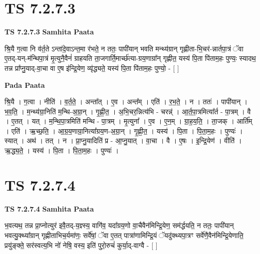 \documentclass[17pt]{extarticle}
\begin{document}
\section*{ TS 7.2.7.3 }

\textbf{TS 7.2.7.3 } \newline
\textbf{Samhita Paata} \newline

श्रि॒यै ग॒त्वा नि व॑र्त॒ते ऽन्ता॑दे॒वाऽन्त॒मा र॑भते॒ न ततः॒ पापी॑यान् भवति मन्थ्य॑ग्रान् गृह्णीता-भि॒चर॑-न्नार्तपा॒त्रं ॅवा ए॒तद्-यन्-म॑न्थिपा॒त्रं मृ॒त्युनै॒वैनं॑ ग्राहयति ता॒जगार्ति॒मार्च्छ॑त्या-ग्रय॒णाग्रा᳚न् गृह्णीत॒ यस्य॑ पि॒ता पि॑ताम॒हः पुण्यः॒ स्यादथ॒ तन्न प्रा᳚प्नु॒याद्-वा॒चा वा ए॒ष इ॑न्द्रि॒येण॒ व्यृ॑द्ध्यते॒ यस्य॑ पि॒ता पि॑ताम॒हः पुण्यो॒ - [  ] \newline

\textbf{Pada Paata} \newline

श्रि॒यै । ग॒त्वा । नीति॑ । व॒र्त॒ते॒ । अन्ता᳚त् । ए॒व । अन्त᳚म् । एति॑ । र॒भ॒ते॒ । न । ततः॑ । पापी॑यान् । भ॒व॒ति॒ । म॒न्थ्य॑ग्रा॒निति॑ म॒न्थि-अ॒ग्रा॒न् । गृ॒ह्णी॒त॒ । अ॒भि॒चर॒न्नित्य॑भि - चरन्न्॑ । आ॒र्त॒पा॒त्रमित्या᳚र्त - पा॒त्रम् । वै । ए॒तत् । यत् । म॒न्थि॒पा॒त्रमिति॑ मन्थि - पा॒त्रम् । मृ॒त्युना᳚ । ए॒व । ए॒न॒म् । ग्रा॒ह॒य॒ति॒ । ता॒जक् । आर्ति᳚म् । एति॑ । ऋ॒च्छ॒ति॒ । आ॒ग्र॒य॒णाग्रा॒नित्या᳚ग्रय॒ण-अ॒ग्रा॒न् । गृ॒ह्णी॒त॒ । यस्य॑ । पि॒ता । पि॒ता॒म॒हः । पुण्यः॑ । स्यात् । अथ॑ । तत् । न । प्रा॒प्नु॒यादिति॑ प्र - आ॒प्नु॒यात् । वा॒चा । वै । ए॒षः । इ॒न्द्रि॒येण॑ । वीति॑ । ऋ॒द्ध्य॒ते॒ । यस्य॑ । पि॒ता । पि॒ता॒म॒हः । पुण्यः॑ ।  \newline




\section*{ TS 7.2.7.4 }

\textbf{TS 7.2.7.4 } \newline
\textbf{Samhita Paata} \newline

भ॒वत्यथ॒ तन्न प्रा॒प्नोत्युर॑ इवै॒तद्-य॒ज्ञ्स्य॒ वागि॑व॒ यदा᳚ग्रय॒णो वा॒चैवैन॑मिन्द्रि॒येण॒ सम॑र्द्धयति॒ न ततः॒ पापी॑यान् भवत्यु॒क्थ्या᳚ग्रान् गृह्णीताभिच॒र्यमा॑णः॒ सर्वे॑षां॒ ॅवा ए॒तत् पात्रा॑णामिन्द्रि॒यं ॅयदु॑क्थ्यपा॒त्रꣳ सर्वे॑णै॒वैन॑मिन्द्रि॒येणाति॒ प्रयु॑ङ्क्ते॒ सर॑स्वत्य॒भि नो॑ नेषि॒ वस्य॒ इति॑ पुरो॒रुचं॑ कुर्या॒द्-वाग्वै - [  ] \newline
\end{document}
